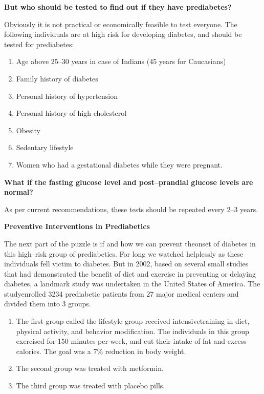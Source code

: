 \noindent\textbf{But who should be tested to find out if they have prediabetes?}

Obviously it is not practical or economically feasible to test everyone. The following individuals are at high risk for developing diabetes, and should be tested for prediabetes:

\begin{enumerate}[•]
\itemsep=0pt
\item Age above 25–30 years in case of Indians (45 years for Caucasians)
\item Family history of diabetes
\item Personal history of hypertension
\item Personal history of high cholesterol
\item Obesity
\item Sedentary lifestyle
\item Women who had a gestational diabetes while they were pregnant.
\end{enumerate}

\noindent\textbf{What if the fasting glucose level and post–prandial glucose levels are normal?}

As per current recommendations, these tests should be repea\-ted every 2–3 years.

\noindent\textbf{Preventive Interventions in Prediabetics}

The next part of the puzzle is if and how we can prevent the\break onset of diabetes in this high–risk group of prediabetics. For long we watched helplessly as these individuals fell victim to diabetes. But in 2002, based on several small studies that had demonstrated the bene\-fit of diet and exercise in preventing or delaying diabetes, a landmark study was under\-taken in the United States of America. The study\break enrolled 3234 prediabetic patients from 27 major medical centers and divided them into 3 groups.

\begin{enumerate}[•]
\itemsep=0pt
\item The first group called the lifestyle group received intensive\break training in diet, physical activity, and behavior modification. The indi\-viduals in this group exercised for 150 minutes per week, and cut their intake of fat and excess calories. The goal was a 7\% reduction in body weight.
\item The second group was treated with metformin.
\item The third group was treated with placebo pills.
\end{enumerate}


